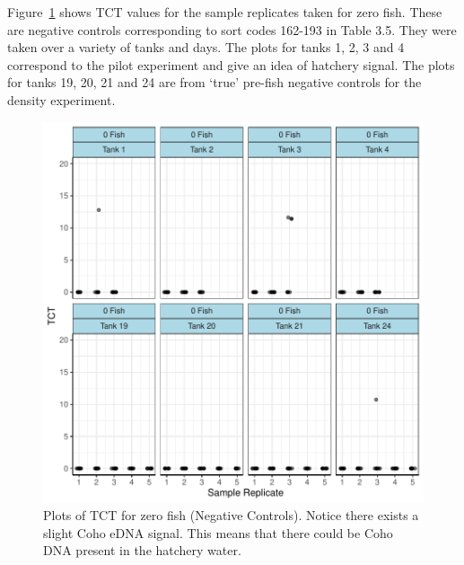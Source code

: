 \vspace{5mm}


Figure~\ref{lab:introplots1232} shows TCT values for the sample replicates taken for zero fish.  These are negative controls corresponding to sort codes 162-193 in Table 3.5. They were taken over a variety of tanks and days. The plots for tanks 1, 2, 3 and 4 correspond to the pilot experiment and give an idea of hatchery signal. The plots for tanks 19, 20, 21 and 24  are from `true' pre-fish negative controls for the density experiment.



\begin{figure}[H]
\includegraphics{Chapter3Images/gz2.pdf}
\begin{center}
\caption{\hspace{1mm} Plots of TCT for zero fish (Negative Controls). Notice there exists a slight Coho eDNA signal. This means that there could be Coho DNA present in the hatchery water. }
\label{lab:introplots1232}
\end{center}
\end{figure}




